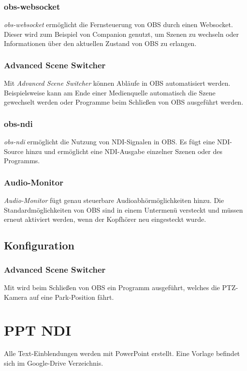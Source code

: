 			\subsubsection{obs-websocket}
				\textit{obs-websocket} ermöglicht die Fernsteuerung von OBS durch einen Websocket.
				Dieser wird zum Beispiel von Companion genutzt, um Szenen zu wechseln oder Informationen über den aktuellen Zustand von OBS zu erlangen.
			\subsubsection{Advanced Scene Switcher}\label{obs:plugins:ass}
				Mit \textit{Advanced Scene Switcher} können Abläufe in \Gls{OBS} automatisiert werden.
				Beispielsweise kann am Ende einer Medienquelle automatisch die Szene gewechselt werden oder Programme beim Schließen von \Gls{OBS} ausgeführt werden.
			\subsubsection{obs-ndi}\label{obs:plugins:ndi}
				\textit{obs-ndi} ermöglicht die Nutzung von \Gls{NDI}-Signalen in \Gls{OBS}.
				Es fügt eine \Gls{NDI}-Source hinzu und ermöglicht eine \Gls{NDI}-Ausgabe einzelner Szenen oder des Programms.
			\subsubsection{Audio-Monitor}
				\textit{Audio-Monitor} fügt genau steuerbare Audioabhörmöglichkeiten hinzu.
				Die Standardmöglichkeiten von OBS sind in einem Untermenü versteckt und müssen erneut aktiviert werden, wenn der Kopfhörer neu eingesteckt wurde.

		\subsection{Konfiguration}
			\subsubsection{Advanced Scene Switcher}\label{obs:config:ass}
			Mit  wird beim Schließen von \Gls{OBS} ein Programm ausgeführt, welches die \Gls{PTZ-Kamera} auf eine Park-Position fährt.
	\section{PPT NDI}
		Alle Text-Einblendungen werden mit PowerPoint erstellt.
		Eine Vorlage befindet sich im Google-Drive Verzeichnis.

